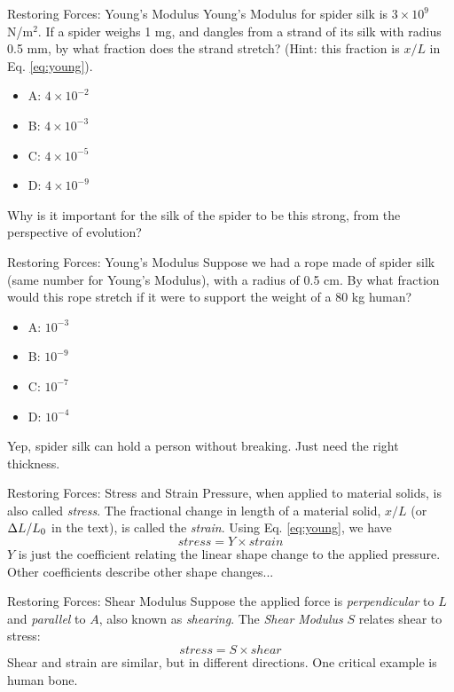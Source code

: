 \documentclass{beamer}
\begin{document}
\begin{frame}{Restoring Forces: Young's Modulus}
Young's Modulus for spider silk is $3 \times 10^9$ N/m$^2$.  If a spider weighs 1 mg, and dangles from a strand of its silk with radius 0.5 mm, by what fraction does the strand stretch?  (Hint: this fraction is $x/L$ in Eq. \ref{eq:young}).
\begin{itemize}
\item A: $4 \times 10^{-2}$
\item B: $4 \times 10^{-3}$
\item C: $4 \times 10^{-5}$
\item D: $4 \times 10^{-9}$
\end{itemize}
Why is it important for the silk of the spider to be this strong, from the perspective of evolution?
\end{frame}

\begin{frame}{Restoring Forces: Young's Modulus}
Suppose we had a rope made of spider silk (same number for Young's Modulus), with a radius of 0.5 cm.  By what fraction would this rope stretch if it were to support the weight of a 80 kg human?
\begin{itemize}
\item A: $10^{-3}$
\item B: $10^{-9}$
\item C: $10^{-7}$
\item D: $10^{-4}$
\end{itemize}
Yep, spider silk can hold a person without breaking.  Just need the right thickness.
\end{frame}

\begin{frame}{Restoring Forces: Stress and Strain}
Pressure, when applied to material solids, is also called \textit{stress}.  The fractional change in length of a material solid, $x/L$ (or $\Delta L/L_{\rm 0}$ in the text), is called the \textit{strain}.  Using Eq. \ref{eq:young}, we have
\begin{equation}
stress = Y \times strain
\end{equation}
$Y$ is just the coefficient relating the linear shape change to the applied pressure.  Other coefficients describe other shape changes...
\end{frame}

\begin{frame}{Restoring Forces: Shear Modulus}
Suppose the applied force is \textit{perpendicular} to $L$ and \textit{parallel} to $A$, also known as \textit{shearing}.  The \textit{Shear Modulus} $S$ relates shear to stress: \\
\begin{equation}
stress = S \times shear
\end{equation}
Shear and strain are similar, but in different directions.  One critical example is human bone.
\end{frame}
\end{document}
